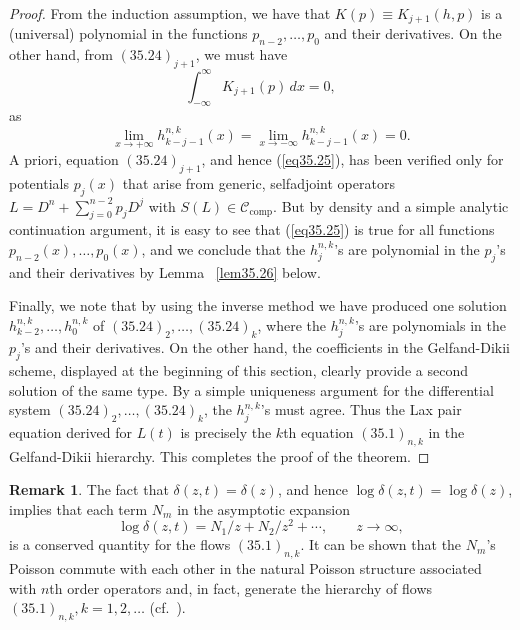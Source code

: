 \documentclass{surv-l}
\theoremstyle{plain}
\theoremstyle{definition}
\newtheorem*{rem}{Remark}
\numberwithin{equation}{chapter}
\begin{document}
\begin{proof}
From the induction assumption, we have that $K(p)\equiv K_{j+1}(h,p)$ is a (universal) polynomial in the functions $p_{n-2},\ldots,p_{0}$ and their derivatives. On the other hand, from $(35.24)_{j+1}$, we must have
\setcounter{equation}{24}
\begin{equation}\label{eq35.25}
\int_{-\infty}^{\infty}K_{j+1}(p)\,dx=0,
\end{equation}
as
\begin{equation*}
\lim_{x\rightarrow+\infty}h_{k-j-1}^{n,k}(x)=\lim_{x\rightarrow-\infty}h_{k-j-1}^{n,k}(x)=0.
\end{equation*}
A priori, equation $(35.24)_{j+1}$, and hence (\ref{eq35.25}), has been verified only for potentials $p_{j}(x)$ that arise from generic, selfadjoint operators $L=D^{n}+\sum_{j=0}^{n-2}p_{j}D^{j}$ with $S(L)\in \mathscr{C}_{\mathrm{comp}}$. But by density and a simple analytic continuation argument, it is easy to see that (\ref{eq35.25}) is true for all functions $p_{n-2}(x),\ldots,p_{0}(x)$, and we conclude that the $h_{j}^{n,k}$'s are polynomial in the $p_{j}$'s and their derivatives by Lemma ~\ref{lem35.26} below.

Finally, we note that by using the inverse method we have produced one solution $h_{k-2}^{n,k},\ldots,  h_{0}^{n,k}$ of $(35.24)_{2},\ldots,(35.24)_{k}$, where the $h_{j}^{n,k}$'s are polynomials in the $p_{j}$'s and their derivatives. On the other hand, the coefficients in the Gelfand-Dikii scheme, displayed at the beginning of this section, clearly provide a second solution of the same type. By a simple uniqueness argument for the differential system $(35.24)_{2},\ldots,(35.24)_{k}$, the $h_{j}^{n,k}$'s must agree. Thus the Lax pair equation derived for $L(t)$ is precisely the $k$th equation $(35.1)_{n,k}$ in the Gelfand-Dikii hierarchy. This completes the proof of the theorem.\quad
\end{proof}
\begin{rem}
The fact that $\delta(z, t)=\delta(z)$, and hence $\log\delta(z, t)=\log\delta(z)$, implies that each term $N_{m}$ in the asymptotic expansion
\begin{equation*}
\log\delta(z,t)=N_{1}/z+N_{2}/z^{2}+\cdots,\qquad z\rightarrow\infty,
\end{equation*}
is a conserved quantity for the flows $(35.1)_{n,k}$. It can be shown that the $N_{m}$'s Poisson commute with each other in the natural Poisson structure associated with $n$th order operators and, in fact, generate the hierarchy of flows $(35.1)_{n,k},k=1,2,\ldots$ (cf.~\cite{GD}).
\end{rem}
\end{document}
